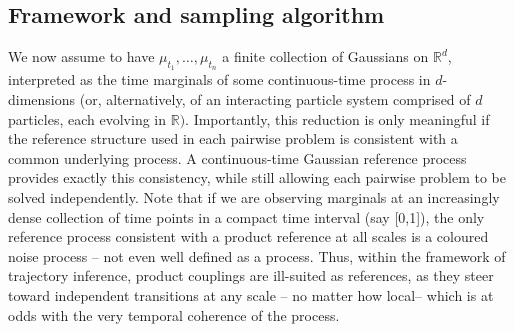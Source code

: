\documentclass[]{article}
\numberwithin{equation}{section}
\theoremstyle{plain}
\begin{document}
\subsection{Framework and sampling algorithm}
We now assume to have $\mu_{t_1},\ldots, \mu_{t_{n}}$ a finite collection of Gaussians on $\mathbb{R}^d$, interpreted as the time marginals of some continuous-time process in $d$-dimensions (or, alternatively, of an interacting particle system comprised of $d$ particles, each evolving in $\mathbb{R})$. {%
{Importantly, this reduction is only meaningful if the reference structure used in each pairwise problem is consistent with a common underlying process. A continuous-time Gaussian reference process provides exactly this consistency, while still allowing each pairwise problem to be solved independently}. Note that if we are observing marginals at an increasingly dense collection of time points in a compact time interval (say [0,1]), the only reference process consistent with a product reference at all scales is a coloured noise process -- not even well defined as a process. Thus, within the framework of trajectory inference, product couplings are ill-suited as references, as they steer toward independent transitions at any scale -- no matter how local-- which is at odds with the very temporal coherence of the process. \\

}
\end{document}
